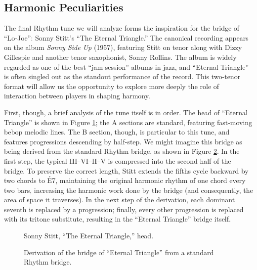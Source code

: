 \subsection{Harmonic Peculiarities}

The final Rhythm tune we will analyze forms the inspiration for the bridge of
``Lo-Joe'': Sonny Stitt's ``The Eternal Triangle.'' The
canonical recording appears on the album \emph{Sonny Side Up} (1957),
featuring Stitt on tenor along with Dizzy Gillespie and another tenor
saxophonist, Sonny Rollins.\nocite{gillespie:sonnyside} The album is widely
regarded as one of the best ``jam session'' albums in jazz, and ``Eternal
Triangle'' is often singled out as the standout performance of the
record. This two-tenor format will allow us the opportunity to
explore more deeply the role of interaction between players in shaping
harmony.

First, though, a brief analysis of the tune itself is in order. The head of
``Eternal Triangle'' is shown in Figure \ref{et:head-melody}; the A sections
are standard, featuring fast-moving bebop melodic lines. The B section,
though, is particular to this tune, and features \tf progressions descending
by half-step. We might imagine this bridge as being derived from the standard
Rhythm bridge, as shown in Figure \ref{et:bridge-derivation}. In the first
step, the typical III--VI--II--V is compressed into the second half of the
bridge. To preserve the correct length, Stitt extends the fifths cycle
backward by two chords to \h{E7}, maintaining the original harmonic rhythm of
one chord every two bars, increasing the harmonic work done by the bridge (and
consequently, the area of \tf space it traverses). In the next step of the
derivation, each dominant seventh is replaced by a \tf progression;
finally, every other \tf progression is replaced with its tritone
substitute, resulting in the ``Eternal Triangle'' bridge itself.

\begin{figure}[tbp]
  \caption{Sonny Stitt, ``The Eternal Triangle,'' head.}
  \label{et:head-melody}
\end{figure}


\begin{figure}[tbp]
  \caption{Derivation of the bridge of ``Eternal Triangle'' from a standard
    Rhythm bridge.}
  \label{et:bridge-derivation}
\end{figure}

